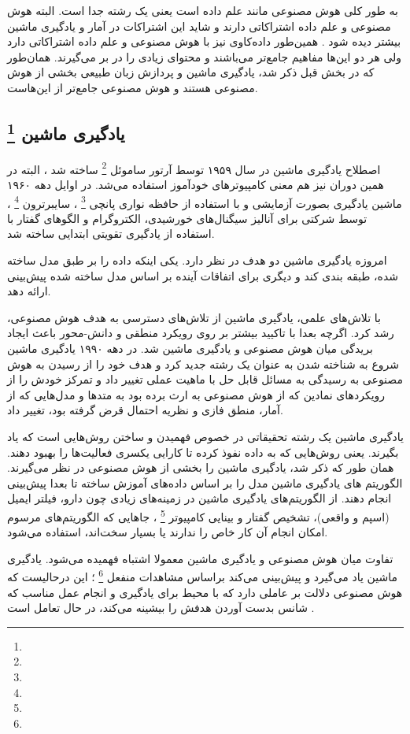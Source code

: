 \documentclass[a4paper, 12pt]{article}
\begin{document}
   به طور کلی هوش مصنوعی مانند علم داده است یعنی یک رشته جدا است. البته هوش مصنوعی و علم داده اشتراکاتی دارند و شاید این اشتراکات در آمار و یادگیری ماشین بیشتر دیده شود . همین‌طور داده‌کاوی نیز با هوش مصنوعی و علم داده اشتراکاتی دارد ولی هر دو این‌ها مفاهیم جامع‌تر می‌باشند و محتوای زیادی را در بر می‌گیرند. همان‌طور که در بخش قبل ذکر شد، یادگیری ماشین و پردازش زبان طبیعی بخشی از هوش مصنوعی هستند و هوش مصنوعی جامع‌تر از این‌هاست. 
   
   \subsection*{یادگیری ماشین
	\footnote{}   
}
اصطلاح یادگیری ماشین در سال ۱۹۵۹ توسط آرتور ساموئل 
\footnote{}
ساخته شد ، البته در همین دوران نیز هم معنی کامپیوتر‌های خودآموز  استفاده می‌شد. در اوایل دهه ۱۹۶۰ ماشین یادگیری بصورت آزمایشی و با استفاده از حافظه نواری پانچی
\footnote{}
، سایبرترون
\footnote{}
، توسط شرکتی برای آنالیز سیگنال‌های خورشیدی، الکتروگرام و الگو‌های گفتار با استفاده از یادگیری تقویتی ابتدایی  ساخته شد. 

امروزه یادگیری ماشین دو هدف در نظر دارد. یکی اینکه داده را بر طبق مدل ساخته شده، طبقه بندی کند و دیگری برای اتفاقات آینده بر اساس مدل ساخته شده پیش‌بینی ارائه دهد. 

با تلاش‌های علمی، یادگیری ماشین از تلاش‌های دسترسی به هدف هوش مصنوعی، رشد کرد. اگرچه بعدا با تاکیید بیشتر بر روی  رویکرد منطقی و دانش-محور باعث ایجاد بریدگی میان هوش مصنوعی و یادگیری ماشین شد. در دهه ۱۹۹۰ یادگیری ماشین شروع به شناخته شدن به عنوان یک رشته جدید کرد و هدف خود را از رسیدن به هوش مصنوعی  به  رسیدگی به مسائل قابل حل با ماهیت عملی  تغییر داد و تمرکز خودش را از رویکرد‌های نمادین که از هوش مصنوعی به ارث برده بود به متد‌ها و مدل‌هایی که از آمار، منطق فازی و نظریه احتمال قرض گرفته بود، تغییر داد. 

یادگیری ماشین یک رشته تحقیقاتی در خصوص فهمیدن و ساختن روش‌هایی است که یاد بگیرند. یعنی روش‌هایی که به داده نفوذ کرده تا کارایی یکسری فعالیت‌ها را بهبود دهند. همان طور که ذکر شد، یادگیری ماشین را بخشی از هوش مصنوعی در نظر می‌گیرند. الگوریتم های یادگیری ماشین مدل را بر اساس داده‌های آموزش ساخته تا بعدا پیش‌بینی انجام دهند. از الگوریتم‌های یادگیری ماشین در زمینه‌های زیادی چون دارو، فیلتر ایمیل (اسپم و واقعی)، تشخیص گفتار و بینایی کامپیوتر
\footnote{}
، جاهایی که الگوریتم‌های مرسوم امکان انجام آن کار خاص را ندارند یا بسیار سخت‌اند، استفاده می‌شود. 


تفاوت میان هوش مصنوعی و یادگیری ماشین معمولا اشتباه فهمیده می‌شود. یادگیری ماشین یاد می‌گیرد و پیش‌بینی می‌کند براساس مشاهدات منفعل 
\footnote{}
؛ این درحالیست که هوش مصنوعی دلالت بر عاملی دارد که با محیط برای یادگیری و انجام عمل مناسب که شانس بدست آوردن هدفش را بیشینه می‌کند، در حال تعامل است .  
\end{document}

